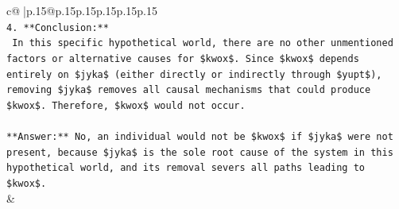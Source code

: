\documentclass{article}
\begin{document}
{\begin{supertabular}{c@{$\;$}|p{.15\linewidth}@{}p{.15\linewidth}p{.15\linewidth}p{.15\linewidth}p{.15\linewidth}p{.15\linewidth}}
{{{\\ 
\texttt{4.  **Conclusion:**} \\
\texttt{    In this specific hypothetical world, there are no other unmentioned factors or alternative causes for \$kwox\$. Since \$kwox\$ depends entirely on \$jyka\$ (either directly or indirectly through \$yupt\$), removing \$jyka\$ removes all causal mechanisms that could produce \$kwox\$. Therefore, \$kwox\$ would not occur.} \\
\\ 
\texttt{**Answer:** No, an individual would not be \$kwox\$ if \$jyka\$ were not present, because \$jyka\$ is the sole root cause of the system in this hypothetical world, and its removal severs all paths leading to \$kwox\$.} \\
            }
        }
    }
    & \\ \\


\end{supertabular}}
\end{document}
